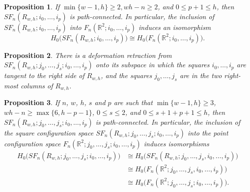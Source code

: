 \documentclass[10pt,a4paper]{amsart}
\newtheorem{prop}{Proposition}
\newcommand{\R}{\ensuremath{\mathbb{R}}}
\begin{document}
\begin{prop}\label{connected single right configuration space}
If $\min\{w-1, h\}\ge 2, wh-n\ge 2$, and $0\le p+1\le h$, then $SF_{n}(R_{w,h}; i_{0}, \dots, i_{p})$ is path-connected.
In particular, the inclusion of $SF_{n}(R_{w,h}; i_{0}, \dots, i_{p})$ into $F_{n}(\R^{2}; i_{0}, \dots, i_{p})$ induces an isomorphism
\[
H_{0}\big(SF_{n}(R_{w,h}; i_{0}, \dots, i_{p})\big)\cong H_{0}\big(F_{n}(\R^{2}; i_{0}, \dots, i_{p})\big).
\]
\end{prop}

\begin{prop}\label{squares in the two rightmost columns}
There is a deformation retraction from $SF_{n}(R_{w,h};j_{0}, \dots, j_{s};i_{0}, \dots, i_{p})$ onto its subspace in which the squares $i_{0}, \dots, i_{p}$ are tangent to the right side of $R_{w,h}$, and the squares $j_{0}, \dots, j_{s}$ are in the two right-most columns of $R_{w,h}$.
\end{prop}

\begin{prop}\label{connected double right configuration space}
If $n$, $w$, $h$, $s$ and $p$ are such that $\min\{w-1,h\}\ge 3$, $wh-n\ge \max\{6, h-p-1\}$, 
$0\le s\le 2$, and $0\le s+1+p+1\le h$, then $SF_{n}(R_{w,h}; j_{0}, \dots, j_{s};i_{0}, \dots, i_{p})$ is path-connected.
In particular, the inclusion of the square configuration space $SF_{n}(R_{w,h}; j_{0}, \dots, j_{s};i_{0}, \dots, i_{p})$ into the point configuration space $F_{n}(\R^{2}; j_{0}, \dots, j_{s};i_{0}, \dots, i_{p})$ induces isomorphisms
\begin{align*}
H_{0}\big(SF_{n}(R_{w,h}; j_{0}, \dots, j_{s};i_{0}, \dots, i_{p})\big)&\cong H_{0}\big(SF_{n}(R_{w,h}; j_{0}, \dots, j_{s}, i_{0}, \dots, i_{p})\big)\\
&\cong H_{0}\big(F_{n}(\R^{2}; j_{0},\dots, j_{s}, i_{0}, \dots, i_{p})\big)\\
&\cong H_{0}\big(F_{n}(\R^{2}; j_{0}, \dots, j_{s}; i_{0}, \dots, i_{p})\big).
\end{align*}
\end{prop}
\end{document}
